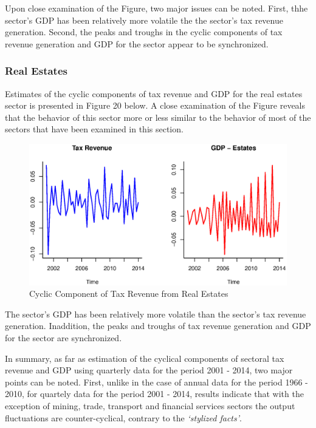 \documentclass[12pt,a4paper,final]{article}
\begin{document}
Upon close examination of the Figure, two major issues can be noted.  First, thhe sector's GDP has been relatively more volatile the the sector's tax revenue generation. Second, the peaks and troughs in the cyclic components of tax revenue generation and GDP for the sector appear to be synchronized.


\subsubsection{Real Estates}

Estimates of the cyclic components of tax revenue and GDP for the real estates sector is presented in Figure 20 below. A close examination of the Figure reveals that the behavior of this sector more or less similar to the behavior of most of the sectors that have been examined in this section.

\begin{figure}[h]
\centering
\begin{small}
\caption{Cyclic Component of Tax Revenue from Real Estates}
\end{small}
\includegraphics[scale=0.501]{estates.eps} 
\end{figure}

The sector's GDP has been relatively more volatile than the sector's tax revenue generation. Inaddition, the peaks and troughs of tax revenue generation and GDP for the sector are synchronized.

In summary, as far as estimation of the cyclical components of sectoral tax revenue and GDP using quarterly data for the period 2001 - 2014, two major points can be noted. First, unlike in the case of annual data for the period 1966 - 2010, for quartely data for the period 2001 - 2014, results indicate that with the exception of mining, trade, transport and financial services sectors the output fluctuations are counter-cyclical, contrary to the \textit{`stylized facts'}. 
\end{document}
